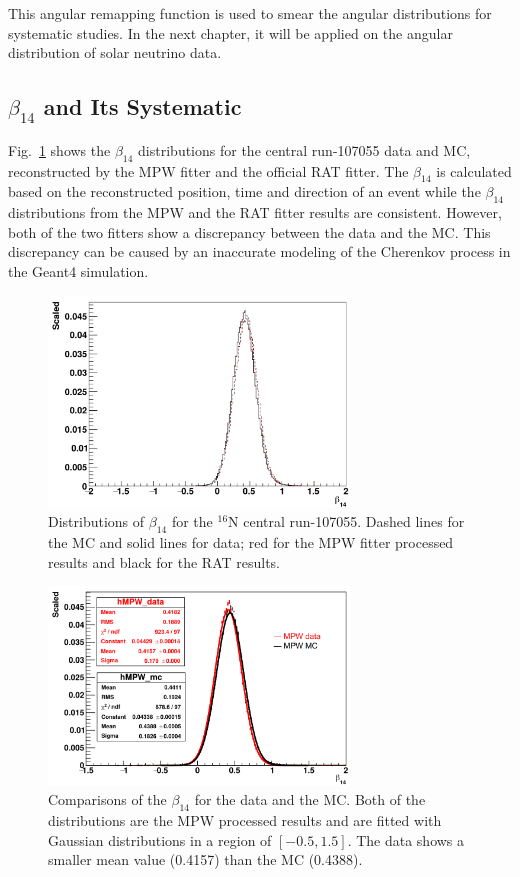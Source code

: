 This angular remapping function is used to smear the angular distributions for systematic studies. In the next chapter, it will be applied on the angular distribution of solar neutrino data. 

\subsection{$\beta_{14}$ and Its Systematic}

Fig.~\ref{N16beta14} shows the $\beta_{14}$ distributions for the central run-107055 data and MC, reconstructed by the MPW fitter and the official RAT fitter. The $\beta_{14}$ is calculated based on the reconstructed position, time and direction of an event while the $\beta_{14}$ distributions from the MPW and the RAT fitter results are consistent. However, both of the two fitters show a discrepancy between the data and the MC. This discrepancy can be caused by an inaccurate modeling of the Cherenkov process in the Geant4 simulation\cite{dunmore2004separation,beta14discrepancy}.

\begin{figure}[htbp]
	\centering
	\includegraphics[width=8cm]{N16_beta14_107055.png}
	\caption{Distributions of $\beta_{14}$ for the $^{16}$N central run-107055. Dashed lines for the MC and solid lines for data; red for the MPW fitter processed results and black for the RAT results.}
	\label{N16beta14}
\end{figure}

\begin{figure}[htbp]
	\centering
	\includegraphics[width=8cm]{N16FitMPW_beta14_107055.png}
	\caption{Comparisons of the $\beta_{14}$ for the data and the MC. Both of the distributions are the MPW processed results and are fitted with Gaussian distributions in a region of $[-0.5,1.5]$. The data shows a smaller mean value (0.4157) than the MC (0.4388).}
	\label{N16beta14MPW}
\end{figure}

